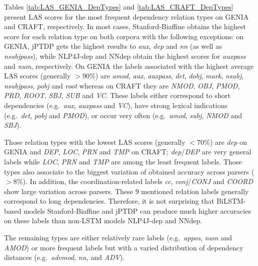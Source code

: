 \documentclass[twocolumn,hyperref]{bmcart}\pdfoutput=1
\begin{document}
Tables \ref{tab:LAS_GENIA_DepTypes} and \ref{tab:LAS_CRAFT_DepTypes} present LAS scores for the most frequent dependency relation types on GENIA and CRAFT, respectively. In most cases, Stanford-Biaffine obtains the highest score for each relation type on both corpora with the following exceptions: on GENIA, jPTDP gets the highest results to \textit{aux}, \textit{dep} and \textit{nn} (as well as \textit{nsubjpass}), while NLP4J-dep and NNdep obtain the highest scores for \textit{auxpass} and \textit{num}, respectively. 
 On GENIA the labels associated with the highest average LAS scores (generally ${>}90\%$) are \textit{amod}, \textit{aux}, \textit{auxpass}, \textit{det}, \textit{dobj}, \textit{mark},  \textit{nsubj}, \textit{nsubjpass}, \textit{pobj} and \textit{root} whereas on CRAFT they are \textit{NMOD}, \textit{OBJ}, \textit{PMOD}, \textit{PRD}, \textit{ROOT}, \textit{SBJ}, \textit{SUB} and \textit{VC}. These labels either correspond to short dependencies (e.g.\ \textit{aux}, \textit{auxpass} and \textit{VC}), have strong lexical indications (e.g.\ \textit{det}, \textit{pobj} and \textit{PMOD}), or  occur very often (e.g.\ \textit{amod}, \textit{subj}, \textit{NMOD} and \textit{SBJ}). 

Those relation types with the lowest LAS scores (generally ${<}70\%$)  are \textit{dep} on GENIA and \textit{DEP}, \textit{LOC}, \textit{PRN} and \textit{TMP} on CRAFT;  \textit{dep}/\textit{DEP} are very general labels while \textit{LOC}, \textit{PRN} and \textit{TMP}  are among the least frequent labels. Those types also associate to the biggest variation of obtained accuracy across parsers (${>}8\%$). In addition, the coordination-related labels \textit{cc}, \textit{conj}/\textit{CONJ} and \textit{COORD} show large variation across parsers. These  9  mentioned relation labels  generally correspond to long dependencies. 
Therefore, it is not surprising that BiLSTM-based models Stanford-Biaffine and jPTDP can produce much higher accuracies on these labels than non-LSTM models NLP4J-dep and NNdep.


The remaining types are either relatively rare labels (e.g.\ \textit{appos}, \textit{num} and \textit{AMOD}) or more frequent labels  but with a varied distribution of dependency distances (e.g.\ \textit{advmod}, \textit{nn}, and \textit{ADV}).
\end{document}
